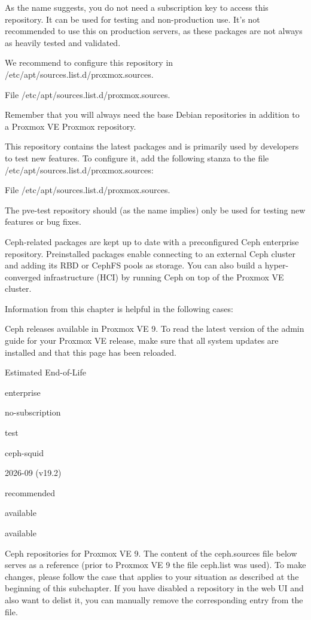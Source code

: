 As the name suggests, you do not need a subscription key to access this repository. It can be used for testing and non-production use. It’s not recommended to use this on production servers, as these packages are not always as heavily tested and validated.

We recommend to configure this repository in /etc/apt/sources.list.d/proxmox.sources.

File /etc/apt/sources.list.d/proxmox.sources.

Remember that you will always need the base Debian repositories in addition to a Proxmox VE Proxmox repository.

This repository contains the latest packages and is primarily used by developers to test new features. To configure it, add the following stanza to the file /etc/apt/sources.list.d/proxmox.sources:

File /etc/apt/sources.list.d/proxmox.sources.

The pve-test repository should (as the name implies) only be used for testing new features or bug fixes.

Ceph-related packages are kept up to date with a preconfigured Ceph enterprise repository. Preinstalled packages enable connecting to an external Ceph cluster and adding its RBD or CephFS pools as storage. You can also build a hyper-converged infrastructure (HCI) by running Ceph on top of the Proxmox VE cluster.

Information from this chapter is helpful in the following cases:

Ceph releases available in Proxmox VE 9. To read the latest version of the admin guide for your Proxmox VE release, make sure that all system updates are installed and that this page has been reloaded.

Estimated End-of-Life

enterprise

no-subscription

test

ceph-squid

2026-09 (v19.2)

recommended

available

available

Ceph repositories for Proxmox VE 9. The content of the ceph.sources file below serves as a reference (prior to Proxmox VE 9 the file ceph.list was used). To make changes, please follow the case that applies to your situation as described at the beginning of this subchapter. If you have disabled a repository in the web UI and also want to delist it, you can manually remove the corresponding entry from the file.


